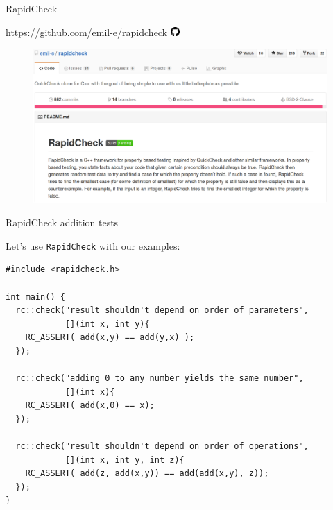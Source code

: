 \documentclass{beamer}
\begin{document}

\begin{frame}[fragile]{RapidCheck}

\begin{minipage}{\textwidth}
\begin{center}
  \scriptsize{\url{https://github.com/emil-e/rapidcheck}}
  \includegraphics[width=10pt]{octo}
\end{center}
\end{minipage}

\begin{figure}
  \includegraphics[width=\textwidth]{rapidcheck.png}
\end{figure}

\end{frame}


\begin{frame}[fragile]{RapidCheck addition tests}

Let's use \texttt{RapidCheck} with our examples:

\begin{lstlisting}[style=cpp]
#include <rapidcheck.h>

int main() {
  rc::check("result shouldn't depend on order of parameters",
            [](int x, int y){
    RC_ASSERT( add(x,y) == add(y,x) );
  });

  rc::check("adding 0 to any number yields the same number",
            [](int x){
    RC_ASSERT( add(x,0) == x);
  });

  rc::check("result shouldn't depend on order of operations",
            [](int x, int y, int z){
    RC_ASSERT( add(z, add(x,y)) == add(add(x,y), z));
  });
}
\end{lstlisting}

\end{frame}
\end{document}
